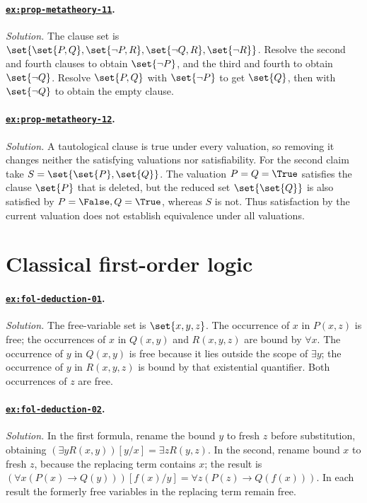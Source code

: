 \paragraph{\hyperref[ex:prop-metatheory-11]{\texttt{ex:prop-metatheory-11}}.}
\textit{Solution.}  The clause set is
\(\set{\set{P,Q},\set{\neg P,R},\set{\neg Q,R},\set{\neg R}}\).
Resolve the second and fourth clauses to obtain \(\set{\neg P}\), and the
third and fourth to obtain \(\set{\neg Q}\).  Resolve \(\set{P,Q}\) with
\(\set{\neg P}\) to get \(\set{Q}\), then with \(\set{\neg Q}\) to obtain
the empty clause.

\paragraph{\hyperref[ex:prop-metatheory-12]{\texttt{ex:prop-metatheory-12}}.}
\textit{Solution.}  A tautological clause is true under every valuation, so
removing it changes neither the satisfying valuations nor satisfiability.  For
the second claim take \(S=\set{\set{P},\set{Q}}\).  The valuation
\(P=Q=\True\) satisfies the clause \(\set{P}\) that is deleted, but the reduced
set \(\set{\set{Q}}\) is also satisfied by \(P=\False,Q=\True\), whereas
\(S\) is not.  Thus satisfaction by the current valuation does not establish
equivalence under all valuations.

\section{Classical first-order logic}

\paragraph{\hyperref[ex:fol-deduction-01]{\texttt{ex:fol-deduction-01}}.}
\textit{Solution.}  The free-variable set is \(\set{x,y,z}\).  The occurrence
of \(x\) in \(P(x,z)\) is free; the occurrences of \(x\) in \(Q(x,y)\) and
\(R(x,y,z)\) are bound by \(\forall x\).  The occurrence of \(y\) in
\(Q(x,y)\) is free because it lies outside the scope of \(\exists y\); the
occurrence of \(y\) in \(R(x,y,z)\) is bound by that existential quantifier.
Both occurrences of \(z\) are free.

\paragraph{\hyperref[ex:fol-deduction-02]{\texttt{ex:fol-deduction-02}}.}
\textit{Solution.}  In the first formula, rename the bound \(y\) to fresh
\(z\) before substitution, obtaining
\((\exists yR(x,y))[y/x]=\exists zR(y,z)\).  In the second, rename bound
\(x\) to fresh \(z\), because the replacing term contains \(x\); the result is
\((\forall x(P(x)\to Q(y)))[f(x)/y]
=\forall z(P(z)\to Q(f(x)))\).  In each result the formerly free variables in
the replacing term remain free.

